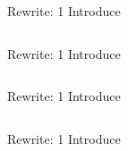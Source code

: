 \begin{frame}{Rewrite: 1}
  Introduce \colorbox{pink!30}{}

  \begin{columns}
    \begin{column}{0.5\textwidth}
      \usebox\typecaseAbox
    \end{column}
    \begin{column}{0.5\textwidth}  %
      \usebox\typecaseBabox
    \end{column}    
  \end{columns}
\end{frame}

\begin{frame}{Rewrite: 1}
  Introduce \colorbox{pink!30}{}

  \begin{columns}
    \begin{column}{0.5\textwidth}
      \usebox\typecaseAbox
    \end{column}
    \begin{column}{0.5\textwidth}  %
      \usebox\typecaseBbox
    \end{column}    
  \end{columns}
\end{frame}

\begin{frame}{Rewrite: 1}
  Introduce \colorbox{pink!30}{}

  \begin{columns}
    \begin{column}{0.5\textwidth}
      \usebox\typecaseAbox
    \end{column}
    \begin{column}{0.5\textwidth}  %
      \usebox\typecaseBbox
    \end{column}    
  \end{columns}
\end{frame}


\def\myLeftArrow{\smash{
  \begin{tikzpicture}[baseline=-2mm]
    \useasboundingbox (-2,0);
    \node[single arrow,draw=black,fill=red!10,minimum width=5cm,minimum height=5cm,shape border rotate=180] at (0,-1) {};
  \end{tikzpicture}
}}

\begin{frame}{Rewrite: 1}
  Introduce \colorbox{pink!30}{}

  \begin{columns}
    \begin{column}{0.5\textwidth}
    \end{column}
    \begin{column}{0.5\textwidth}  %
    \only<2>{\myLeftArrow\vfill}
    \end{column}    
  \end{columns}
\end{frame}




